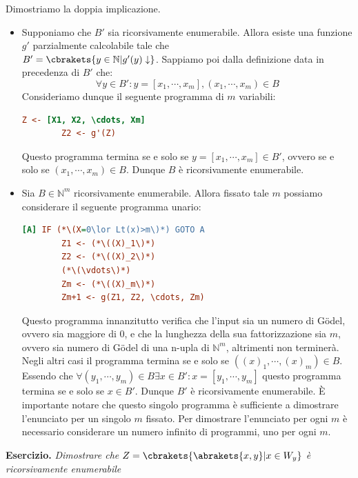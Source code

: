 Dimostriamo la doppia implicazione.
\begin{itemize}
    \item[\(\Longleftarrow\)] Supponiamo che \(B'\) sia ricorsivamente enumerabile. Allora esiste una funzione \(g'\) parzialmente calcolabile tale che \\
    \(B'=\cbrakets{y \in \mathbb{N} \vert g'(y)\downarrow}\). Sappiamo poi dalla definizione data in precedenza di \(B'\) che:
    \begin{equation}
        \forall y \in B': y=[x_1, \cdots, x_m], (x_1, \cdots, x_m) \in B
    \end{equation}
    Consideriamo dunque il seguente programma di \(m\) variabili:
    \begin{lstlisting}[language=ini,  caption={ }]
        Z <- [X1, X2, \cdots, Xm]
        Z2 <- g'(Z)
    \end{lstlisting}
    Questo programma termina se e solo se \(y=[x_1, \cdots, x_m] \in B'\), ovvero se e solo se \((x_1, \cdots, x_m) \in B\). Dunque \(B\) è ricorsivamente enumerabile.
    \item[\(\Longrightarrow\)] Sia \(B \in \mathbb{N}^m\) ricorsivamente enumerabile. Allora fissato tale \(m\) possiamo considerare il seguente programma unario:
    \begin{lstlisting}[language=ini,  caption={ }]
    [A] IF (*\(X=0\lor Lt(x)>m\)*) GOTO A
        Z1 <- (*\((X)_1\)*)
        Z2 <- (*\((X)_2\)*)
        (*\(\vdots\)*)
        Zm <- (*\((X)_m\)*)
        Zm+1 <- g(Z1, Z2, \cdots, Zm)
    \end{lstlisting}
    Questo programma innanzitutto verifica che l'input sia un numero di Gödel, ovvero sia maggiore di \(0\), e che la lunghezza della sua fattorizzazione sia \(m\), ovvero sia numero di Gödel di una n-upla di \(\mathbb{N}^m\), altrimenti non terminerà. Negli altri casi il programma termina se e solo se \(({(x)}_1, \cdots, {(x)}_m) \in B\). Essendo che \(\forall (y_1, \cdots, y_m) \in B \exists x \in B' : x=[y_1, \cdots, y_m]\) questo programma termina se e solo se \(x \in B'\). Dunque \(B'\) è ricorsivamente enumerabile.
    È importante notare che questo singolo programma è sufficiente a dimostrare l'enunciato per un singolo \(m\) fissato. Per dimostrare l'enunciato per ogni \(m\) è necessario considerare un numero infinito di programmi, uno per ogni \(m\).
\end{itemize}

\textbf{Esercizio. } \textit{Dimostrare che \(Z=\cbrakets{ \abrakets{ x,y } \vert x \in W_y}\) è ricorsivamente enumerabile}

